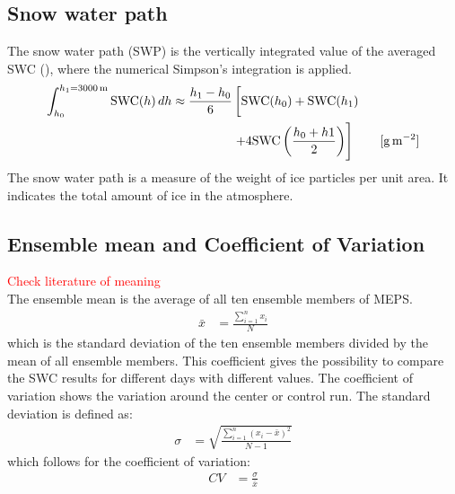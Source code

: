 \subsection{Snow water path}
The snow water path (SWP) is the vertically integrated value of the averaged SWC (), where the numerical Simpson's integration is applied.  
\begin{equation}
\begin{split}
\int_{h_0}^{h_1=\SI{3000}{\metre}} \text{SWC}(h) \, dh \approx 
\frac{h_1 - h_0}{6}  & \left[ \text{SWC}(h_0)    + \text{SWC}(h_1)   \vphantom{\frac{h_0 + h1}{2}} \right. \\ 
& \left. + 4 \text{SWC}\left(\frac{h_0 + h1}{2}\right)  
\right] \qquad [\SI{}{\g\per\square\meter}]
\end{split}
\label{eq:SWP}
\end{equation}
The snow water path is a measure of the weight of ice particles per unit area. It indicates the total amount of ice in the atmosphere.
\subsection{Ensemble mean and Coefficient of Variation}\label{sec:ens_mean_spread}
\textcolor{red}{Check literature of meaning} \\
The ensemble mean is the average of all ten ensemble members of MEPS.
\begin{align}
	\bar{x} & = \frac{\sum_{i=1}^n x_i}{N} \label{eq:meanMEPS}
\end{align}
which is the standard deviation of the ten ensemble members divided by the mean of all ensemble members. This coefficient gives the possibility to compare the SWC results for different days with different values. 
The coefficient of variation shows the variation around the center or control run.
The standard deviation is defined as:
\begin{align}
	\sigma & = \sqrt{\frac{\sum_{i=1}^n (x_i - \bar{x})^2}{N-1}} \label{eq:stdMEPS}
\end{align}
which follows for the coefficient of variation:
\begin{align}
	CV & = \frac{\sigma}{\bar{x}}
\end{align}

